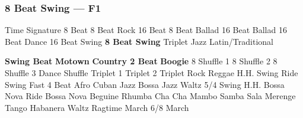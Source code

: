 \subsubsection[8 Beat Swing]{8 Beat Swing --- \UiKey{\II}\UiKey{\MET}F1}
Time Signature
8 Beat
8 Beat Rock
16 Beat
8 Beat Ballad
16 Beat Ballad
16 Beat Dance
16 Beat Swing
\textbf{8 Beat Swing}
Triplet
Jazz
Latin/Traditional





























\textbf{Swing Beat}
\textbf{Motown}
\textbf{Country 2 Beat}
\textbf{Boogie}
8 Shuffle 1
8 Shuffle 2
8 Shuffle 3
Dance Shuffle
Triplet 1
Triplet 2
Triplet Rock
Reggae
H.H. Swing
Ride Swing
Fast 4 Beat
Afro Cuban
Jazz Bossa
Jazz Waltz
5/4 Swing
H.H. Bossa Nova
Ride Bossa Nova
Beguine
Rhumba
Cha Cha
Mambo
Samba
Sala
Merenge
Tango
Habanera
Waltz
Ragtime
March
6/8 March

